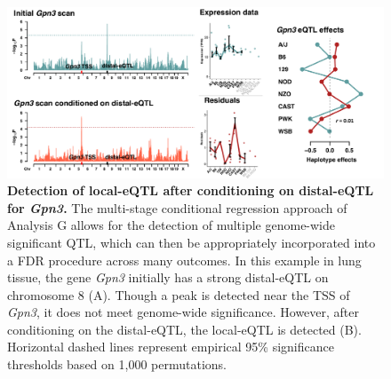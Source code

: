 \documentclass[10pt,letterpaper,twoside]{article}
\begin{document}
\begin{figure}[hp]
\renewcommand{\familydefault}{\sfdefault}\normalfont
\centering
\includegraphics[width=\textwidth, trim={0in 0in 0in 0in}, clip]{figs/gpn3_conditional_scan.pdf}
\caption{\textbf{Detection of local-eQTL after conditioning on distal-eQTL for \textit{Gpn3}.} 
The multi-stage conditional regression approach of Analysis G allows for the detection of multiple genome-wide significant QTL, which can then be appropriately incorporated into a FDR procedure across many outcomes. In this example in lung tissue, the gene \textit{Gpn3} initially has a strong distal-eQTL on chromosome 8 (A). Though a peak is detected near the TSS of \textit{Gpn3}, it does not meet genome-wide significance. However, after conditioning on the distal-eQTL, the local-eQTL is detected (B). Horizontal dashed lines represent empirical 95\% significance thresholds based on 1,000 permutations.
\label{fig:conditional_scans}}
\end{figure}
\end{document}
